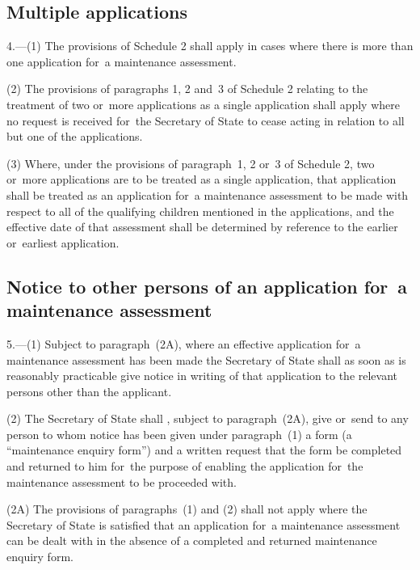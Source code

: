 \documentclass[a4paper,12pt]{article}
\begin{document}

\subsection[4. Multiple applications]{Multiple applications}

4.—(1) The provisions of Schedule 2 shall apply in cases where there is more than one application for~a maintenance assessment.

(2) The provisions of paragraphs 1, 2 and~3 of Schedule 2 relating to the treatment of two or~more applications as a single application shall apply where no request is received for~the Secretary of State to cease acting in relation to all but one of the applications.

(3) Where, under the provisions of paragraph~1, 2 or~3 of Schedule 2, two or~more applications are to be treated as a single application, that application shall be treated as an application for~a maintenance assessment to be made with respect to all of the qualifying children mentioned in the applications, and the effective date of that assessment shall be determined by reference to the earlier or~earliest application.

\subsection[5. Notice to other persons of an application for~a maintenance assessment]{Notice to other persons of an application for~a maintenance assessment}

5.—(1) 
Subject to paragraph~(2A), where %
an effective application for~a maintenance assessment has been made the Secretary of State shall as soon as is reasonably practicable give notice in writing of that application to the relevant persons other than the applicant.

(2) The Secretary of State shall%
, subject to paragraph~(2A), %
 give or~send to any person to whom notice has been given under paragraph~(1) a form (a “maintenance enquiry form”) and a written request that the form be completed and returned to him for~the purpose of enabling the application for~the maintenance assessment to be proceeded with.

(2A) The provisions of paragraphs~(1) and (2) shall not apply where the Secretary of State is satisfied that an application for~a maintenance assessment can be dealt with in the absence of a completed and returned maintenance enquiry form. %
\end{document}
